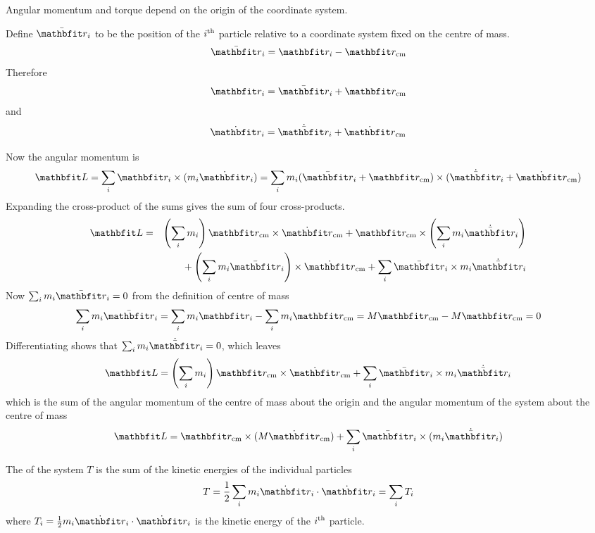 \begin{example}
\label{mpd ex:L and N}
Angular momentum and torque depend on the origin of the coordinate system.

Define $\bar{\vect{r}}_i$ to be the position of the $i^{\rm th}$ particle 
relative to a coordinate system fixed on the centre of mass.
$$\bar{\vect{r}}_i=\vect{r}_i-\vect{r}_{\rm cm}$$
Therefore
$$\vect{r}_i=\bar{\vect{r}}_i+\vect{r}_{\rm cm}$$
and
$$\dot{\vect{r}}_i=\dot{\bar{\vect{r}}}_i+\dot{\vect{r}}_{\rm cm}$$

Now the angular momentum is
$$\vect{L}=\sum_i\vect{r}_i\times(m_i\dot{\vect{r}}_i)
=\sum_i m_i(\bar{\vect{r}}_i+\vect{r}_{\rm cm})
\times(\dot{\bar{\vect{r}}}_i+\dot{\vect{r}}_{\rm cm})$$
Expanding the cross-product of the sums gives the sum of four
cross-products. 
\begin{eqnarray*}
\vect{L}&=&
\left(\sum_i m_i\right)\vect{r}_{\rm cm}\times\dot{\vect{r}}_{\rm cm}
+\vect{r}_{\rm cm}\times\left(\sum_im_i\dot{\bar{\vect{r}}}_i\right)\\
&&{}
+\left(\sum_i m_i\bar{\vect{r}}_i\right)\times\dot{\vect{r}}_{\rm cm}
+\sum_i \bar{\vect{r}}_i\times m_i\dot{\bar{\vect{r}}}_i
\end{eqnarray*}
Now $\sum_i m_i\bar{\vect{r}}_i=0$ from the definition of centre of mass
$$\sum_i m_i\bar{\vect{r}}_i=\sum_im_i\vect{r}_i-\sum_im_i\vect{r}_{\rm cm}
=M\vect{r}_{\rm cm}-M\vect{r}_{\rm cm}=0$$
Differentiating shows that $\sum_i m_i\dot{\bar{\vect{r}}}_i=0$, which
leaves
$$\vect{L}=
\left(\sum_i m_i\right)\vect{r}_{\rm cm}\times\dot{\vect{r}}_{\rm cm}
+\sum_i \bar{\vect{r}}_i\times m_i\dot{\bar{\vect{r}}}_i$$
which is the sum of the angular momentum of the centre of mass about the 
origin and the angular momentum of the system about the centre of mass
$$\vect{L}=
\vect{r}_{\rm cm}\times(M\dot{\vect{r}}_{\rm cm})
+\sum_i \bar{\vect{r}}_i\times (m_i\dot{\bar{\vect{r}}}_i)$$
\end{example}


The  of the system $T$ is the sum of the kinetic
energies of the individual particles
$$T=\frac{1}{2}\sum_im_i\dot{\vect{r}}_i\cdot\dot{\vect{r}}_i=\sum_i T_i$$
where $T_i=\frac{1}{2}m_i\dot{\vect{r}}_i\cdot\dot{\vect{r}}_i$ is the
kinetic energy of the $i^{\rm th}$ particle.

